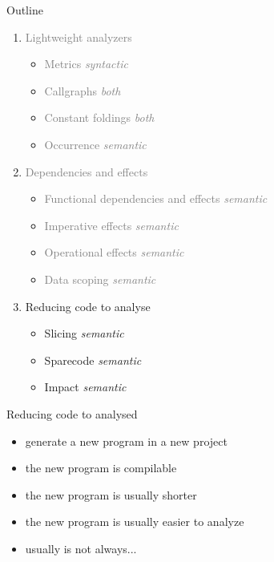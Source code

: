 \documentclass{beamer}
\newcommand{\orange}[1]{{\textcolor{frama-c-1}{#1}}}
\newcommand{\vvert}[1]{{\textcolor{vert}{#1}}}
\newcommand{\gris}[1]{{\textcolor{gray}{#1}}}
\newenvironment{sect}[1]{\orange{#1}\begin{itemize}}{\end{itemize}}
\newenvironment{features}{\begin{sect}{Features}}{\end{sect}}
\begin{document}

\begin{frame}{Outline}
\begin{enumerate}
\item \gris{Lightweight analyzers}
  \begin{itemize}
  \item \gris{Metrics           \hfill \emph{syntactic}}
  \item \gris{Callgraphs        \hfill \emph{both}}
  \item \gris{Constant foldings \hfill \emph{both}}
  \item \gris{Occurrence        \hfill \emph{semantic}}
  \end{itemize}\medskip
%
\item \gris{Dependencies and effects}
  \begin{itemize}
  \item \gris{Functional dependencies and effects \hfill \emph{semantic}}
  \item \gris{Imperative effects       \hfill \emph{semantic}}
  \item \gris{Operational effects      \hfill \emph{semantic}}
  \item \gris{Data scoping             \hfill \emph{semantic}}
  \end{itemize}\medskip
%
\item \vvert{Reducing code to analyse}
  \begin{itemize}
  \item Slicing   \hfill \emph{semantic}
  \item Sparecode \hfill \emph{semantic}
  \item Impact    \hfill \emph{semantic}
  \end{itemize}
\end{enumerate}
\end{frame}


\begin{frame}{Reducing code to analysed}

\begin{features}
\item generate a new program in a new project
\item the new program is compilable
\item the new program is usually shorter
\item the new program is usually easier to analyze
\end{features}\medskip

\begin{sect}{Warning}
\item usually is not always...
\end{sect}

\end{frame}
\end{document}
